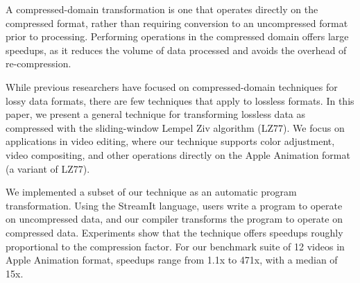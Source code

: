 A compressed-domain transformation is one that operates directly on
the compressed format, rather than requiring conversion to an
uncompressed format prior to processing.  Performing operations in the
compressed domain offers large speedups, as it reduces the volume of
data processed and avoids the overhead of re-compression.

While previous researchers have focused on compressed-domain
techniques for lossy data formats, there are few techniques that apply
to lossless formats.  In this paper, we present a general technique
for transforming lossless data as compressed with the sliding-window
Lempel Ziv algorithm (LZ77).  We focus on applications in video
editing, where our technique supports color adjustment, video
compositing, and other operations directly on the Apple Animation
format (a variant of LZ77).

We implemented a subset of our technique as an automatic program
transformation.  Using the StreamIt language, users write a program to
operate on uncompressed data, and our compiler transforms the program
to operate on compressed data.  Experiments show that the technique
offers speedups roughly proportional to the compression factor.  For
our benchmark suite of 12 videos in Apple Animation format, speedups
range from 1.1x to 471x, with a median of 15x.

